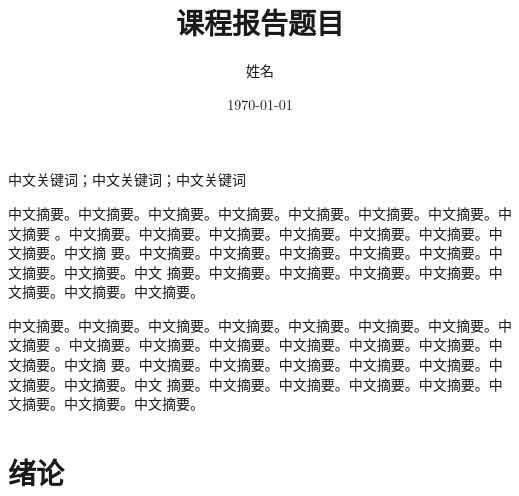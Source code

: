 \documentclass[supercite]{HustMasterReport}
\title{课程报告题目}
\author{姓名}
\date{\today}
\theoremstyle{definition}
\begin{document}
\maketitle


\clearpage


\begin{cnabstract}{中文关键词；中文关键词；中文关键词}

中文摘要。中文摘要。中文摘要。中文摘要。中文摘要。中文摘要。中文摘要。中文摘要
。中文摘要。中文摘要。中文摘要。中文摘要。中文摘要。中文摘要。中文摘要。中文摘
要。中文摘要。中文摘要。中文摘要。中文摘要。中文摘要。中文摘要。中文摘要。中文
摘要。中文摘要。中文摘要。中文摘要。中文摘要。中文摘要。中文摘要。中文摘要。

中文摘要。中文摘要。中文摘要。中文摘要。中文摘要。中文摘要。中文摘要。中文摘要
。中文摘要。中文摘要。中文摘要。中文摘要。中文摘要。中文摘要。中文摘要。中文摘
要。中文摘要。中文摘要。中文摘要。中文摘要。中文摘要。中文摘要。中文摘要。中文
摘要。中文摘要。中文摘要。中文摘要。中文摘要。中文摘要。中文摘要。中文摘要。

\end{cnabstract}





\tableofcontents[level=2]
\clearpage


\section{绪论}
\end{document}
